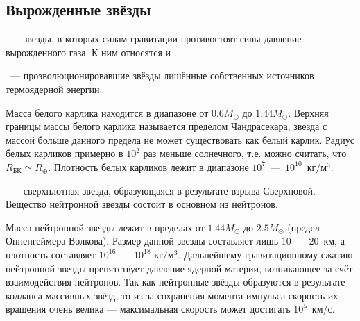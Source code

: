 \subsection{Вырожденные звёзды}
~--- звезды, в которых силам гравитации противостоят силы давление вырожденного газа. К ним относятся  и . 

~--- проэволюционировавшие звёзды лишённые собственных источников термоядерной энергии. 

Масса белого карлика находится в диапазоне от $0.6M_{\odot}$ до $1.44 M_{\odot}$. Верхняя границы массы белого карлика называется пределом Чандрасекара, звезда с массой больше данного предела не может существовать как белый карлик. Радиус белых карликов примерно в $10^2$ раз меньше солнечного, т.е. можно считать, что $R_\text{БК} \simeq R_\oplus$. Плотность белых карликов лежит в диапазоне $10^7$~---~$10^{10}$~$\text{кг}/\text{м}^3$.

~--- сверхплотная звезда, образующаяся в результате взрыва Сверхновой. Вещество нейтронной звезды состоит в основном из нейтронов. 

Масса нейтронной звезды лежит в пределах от $1.44M_{\odot}$ до $2.5M_{\odot}$ (предел Оппенгеймера-Волкова). Размер данной звезды составляет лишь $10$~--- $20$~км, а плотность составляет $10^{16}$~--- $10^{18}$ $\text{кг}/\text{м}^3$.  Дальнейшему гравитационному сжатию нейтронной звезды препятствует давление ядерной материи, возникающее за счёт взаимодействия нейтронов. Так как нейтронные звёзды образуются в результате  коллапса массивных звёзд, то из-за сохранения момента импульса скорость их вращения очень велика --- максимальная скорость может достигать $10^5$~км/с.